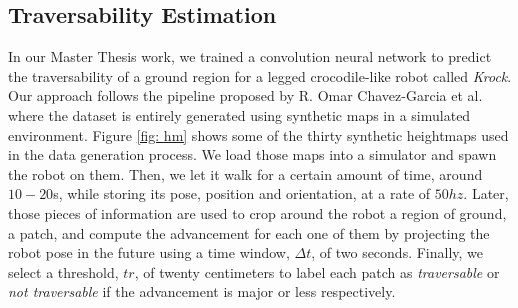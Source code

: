 \documentclass[twocolumn,showpacs,
  nofootinbib,aps,superscriptaddress,
  eqsecnum,prd,notitlepage,showkeys,10pt]{revtex4-1}
\begin{document}
\subsection{Traversability Estimation}
In our Master Thesis work, we trained a convolution neural network to predict the traversability of a ground region for a legged crocodile-like robot called \emph{Krock}. Our approach follows the pipeline proposed by R. Omar Chavez-Garcia et al. \cite{omar} where the dataset is entirely generated using synthetic maps in a simulated environment. Figure \ref{fig: hm} shows some of the thirty synthetic heightmaps used in the data generation process. We load those maps into a simulator and spawn the robot on them. Then, we let it walk for a certain amount of time, around $10-20$s, while storing its pose, position and orientation, at a rate of $50hz$. Later, those pieces of information are used to crop around the robot a region of ground, a patch, and compute the advancement for each one of them by projecting the robot pose in the future using a time window, $\Delta t$, of two seconds. Finally, we select a threshold, $tr$, of twenty centimeters to label each patch as \emph{traversable} or \emph{not traversable} if the advancement is major or less respectively. 
\end{document}
